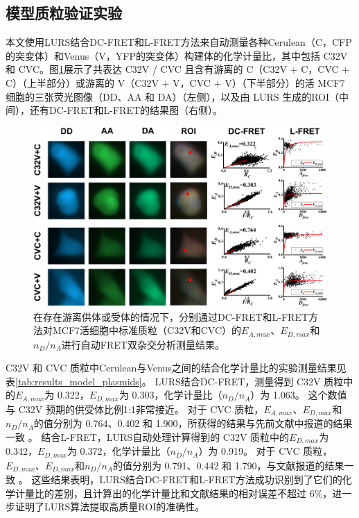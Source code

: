 \subsection{模型质粒验证实验}

本文使用LURS结合DC-FRET和L-FRET方法来自动测量各种Cerulean（C，CFP的突变体）和Venus（V，YFP的突变体）构建体的化学计量比，其中包括 C32V 和 CVC。图\ref{fig:results_model_plasmids}展示了共表达 C32V / CVC 且含有游离的 C（C32V + C，CVC + C）（上半部分）或游离的 V（C32V + V，CVC + V）（下半部分）的活 MCF7 细胞的三张荧光图像（DD、AA 和 DA）（左侧），以及由 LURS 生成的ROI（中间），还有DC-FRET和L-FRET的结果图（右侧）。
\begin{figure}[htbp]
    \centering
    \includegraphics[width=1\linewidth]{../figures/3/LURS模型质粒双杂交.png}
    \caption[模型质粒验证实验结果]{在存在游离供体或受体的情况下，分别通过DC-FRET和L-FRET方法对MCF7活细胞中标准质粒（C32V和CVC）的$E_{A, max}$、$E_{D, max}$和$n_D/n_A$进行自动FRET双杂交分析测量结果。}
    \label{fig:results_model_plasmids}
\end{figure}

C32V 和 CVC 质粒中Cerulean与Venus之间的结合化学计量比的实验测量结果见表\ref{tab:results_model_plasmids}。
LURS结合DC-FRET，测量得到 C32V 质粒中的$E_{A,max}$为 0.322，$E_{D,max}$为 0.303，化学计量比（$n_D/n_A$）为 1.063。
这个数值与 C32V 预期的供受体比例1:1非常接近。
对于 CVC 质粒，$E_{A,max}$、$E_{D,max}$和$n_D/n_A$的值分别为 0.764、0.402 和 1.900，所获得的结果与先前文献中报道的结果一致 。
结合L-FRET，LURS自动处理计算得到的 C32V 质粒中的$E_{D,max}$为 0.342，$E_{D,max}$为 0.372，化学计量比（$n_D/n_A$）为 0.919。
对于 CVC 质粒，$E_{D,max}$、$E_{D,max}$和$n_D/n_A$的值分别为 0.791、0.442 和 1.790，与文献报道的结果一致 。
这些结果表明，LURS结合DC-FRET和L-FRET方法成功识别到了它们的化学计量比的差别，且计算出的化学计量比和文献结果的相对误差不超过 6\%，进一步证明了LURS算法提取高质量ROI的准确性。


